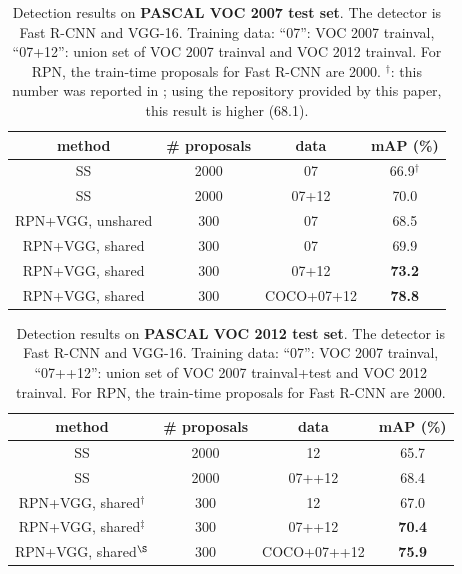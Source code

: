\documentclass[10pt,journal,cspaper,compsoc]{IEEEtran}
\begin{document}
\setlength{\tabcolsep}{10pt}
\renewcommand{\arraystretch}{1.1}
\begin{table}[t]
\begin{center}
\caption{Detection results on \textbf{PASCAL VOC 2007 test set}. The detector is Fast R-CNN and VGG-16. Training data: ``07'': VOC 2007 trainval, ``07+12'': union set of VOC 2007 trainval and VOC 2012 trainval. For RPN, the train-time proposals for Fast R-CNN are 2000. $^\dag$: this number was reported in \cite{Girshick2015a}; using the repository provided by this paper, this result is higher (68.1).}
\vspace{-1em}
\small
\begin{tabular}{cc|c|c}
  method & \# proposals & data & mAP (\%) \\
  \hline\hline
  SS & 2000 & 07 & 66.9$^\dag$ \\
  SS & 2000 & 07+12 & 70.0 \\
  \hline
  RPN+VGG, unshared & 300 & 07 & 68.5 \\
  RPN+VGG, shared & 300 & 07 & 69.9 \\
  RPN+VGG, shared & 300 & 07+12 & \textbf{73.2} \\
  \hline
  RPN+VGG, shared & 300 & COCO+07+12 & \textbf{78.8} \\
\end{tabular}
\label{tab:vgg}
\end{center}
\end{table}

\begin{table}[t]
\begin{center}
\caption{Detection results on \textbf{PASCAL VOC 2012 test set}. The detector is Fast R-CNN and VGG-16. Training data: ``07'': VOC 2007 trainval, ``07++12'': union set of VOC 2007 trainval+test and VOC 2012 trainval. For RPN, the train-time proposals for Fast R-CNN are 2000. \fontsize{8pt}{1em}}
\vspace{-1em}
\small
\begin{tabular}{cc|c|c}
  method & \# proposals & data & mAP (\%) \\
  \hline\hline
  SS & 2000 & 12 & 65.7 \\
  SS & 2000 & 07++12 & 68.4 \\
  \hline
  RPN+VGG, shared$^\dag$ & 300 & 12 & 67.0 \\
  RPN+VGG, shared$^\ddag$ & 300 & 07++12 & \textbf{70.4} \\
  \hline
  RPN+VGG, shared$^\S$ & 300 & COCO+07++12 & \textbf{75.9} \\
\end{tabular}
\label{tab:vgg12}
\end{center}
\end{table}
\end{document}
